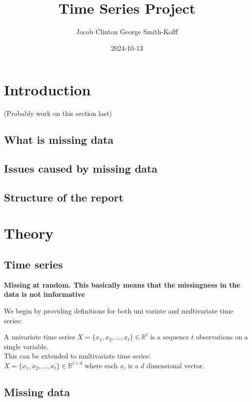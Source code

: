 \documentclass[
]{report}
\title{Time Series Project}
\author{Jacob Clinton George Smith-Kolff}
\date{2024-10-13}
\begin{document}
\maketitle

{
\setcounter{tocdepth}{1}
\tableofcontents
}
\chapter{Introduction}\label{introduction}

(Probably work on this section last)

\section{What is missing data}\label{what-is-missing-data}

\section{Issues caused by missing
data}\label{issues-caused-by-missing-data}

\section{Structure of the report}\label{structure-of-the-report}

\chapter{Theory}\label{theory}

\section{Time series}\label{time-series}

\textbf{Missing at random. This basically means that the missingness in the data is not imformative}

We begin by providing definitions for both uni variate and multivariate
time series:

A univariate time series \(X = \{x_1, x_2, ..., x_t\} \in \mathbb{R}^t\)
is a sequence \(t\) observations on a single variable.\\
This can be extended to multivariate time series:\\
\(X = \{x_1, x_2, ..., x_t\}\in \mathbb{R}^{t\times d}\) where each
\(x_i\) is a \(d\) dimensional vector.

\section{Missing data}\label{missing-data}
\end{document}
